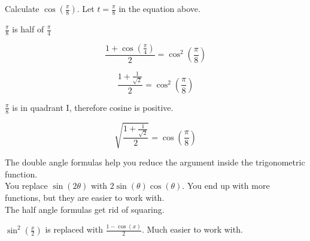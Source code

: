 \documentclass{ximera}
\begin{document}
\begin{example}

Calculate $\cos\left(  \frac{\pi}{8}  \right)$.
Let $t = \frac{\pi}{8}$ in the equation above.



\begin{explanation}

$\frac{\pi}{8}$ is half of $\frac{\pi}{4}$




\[   \frac{1 + \cos( \frac{\pi}{4} )}{2}  =   \cos^2\left( \frac{\pi}{8} \right)  \]


\[   \frac{1 + \frac{1}{\sqrt{2}}}{2}  =   \cos^2\left( \frac{\pi}{8} \right)  \]



$\frac{\pi}{8}$ is in quadrant I, therefore cosine is positive.




\[   \sqrt{ \frac{1 + \frac{1}{\sqrt{2}}}{2} }  =   \cos\left( \frac{\pi}{8} \right)  \]





\end{explanation}

\end{example}


The double angle formulas help you reduce the argument inside the trigonometric function. \\


You replace $\sin(2 \theta)$ with $2 \sin(\theta) \cos(\theta)$.  You end up with more functions, but they are easier to work with. \\


The half angle formulas get rid of squaring.


$\sin^2\left( \tfrac{x}{2} \right)$ is replaced with $\frac{1 - \cos(x)}{2}$.  Much easier to work with.
\end{document}
